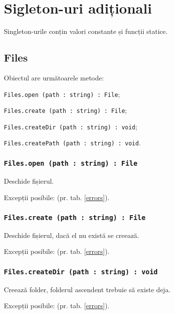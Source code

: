 
\section{Sigleton-uri adiționali}

Singleton-urile conțin valori constante și funcții statice.

\subsection{Files}

Obiectul \files{} are următoarele metode:
\begin{icItems}
	\item \texttt{Files.open (path : string) : File};
	\item \texttt{Files.create (path : string) : File};
	\item \texttt{Files.createDir (path : string) : void};
	\item \texttt{Files.createPath (path : string) : void}.
\end{icItems}

\subsubsection{\texttt{Files.open (path : string) : File}}

Deschide fișierul.

Excepții posibile:  (pr. tab. \ref{errors}).

\subsubsection{\texttt{Files.create (path : string) : File}}

Deschide fișierul, dacă el nu există se creează.

Excepții posibile:  (pr. tab. \ref{errors}).

\subsubsection{\texttt{Files.createDir (path : string) : void}}

Creează folder, folderul ascendent trebuie să existe deja.

Excepții posibile:  (pr. tab. \ref{errors}).

